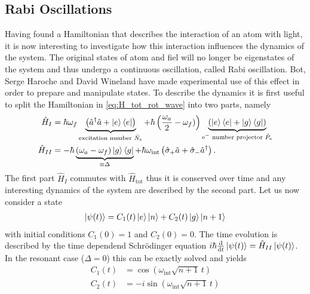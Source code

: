 \subsection{Rabi Oscillations}
Having found a Hamiltonian that describes the interaction of an atom with light,
it is now interesting to investigate how this interaction influences the
dynamics of the system. The original states of atom and fiel will no longer be
eigenstates of the system and thus undergo a continuous oscillation, called Rabi
oscillation. Bot, Serge Haroche and David Wineland have made experimental use of
this effect in order to prepare and manipulate states. To describe the dynamics
it is first useful to split the Hamiltonian in \eqref{eq:H_tot_rot_wave} into
two parts, namely
\begin{align}
  \label{eq:H_I_H_II}
  \hat{H}_I &= \hbar\omega_f\underbrace{\left( \hat{a}^\dagger\hat{a} +
  \ket{e}\bra{e}\right)}_{\text{excitation number }\hat{N}_e} + \hbar \left( \frac{\omega_a}{2} -
\omega_f)\right)\underbrace{\left(\ket{e}\bra{e} +
\ket{g}\bra{g}\right)}_{\text{e$^-$ number projector }\hat{P}_e} \\
\hat{H}_{II} &= -\hbar \underbrace{\left(\omega_a -
\omega_f\right)\ket{g}\bra{g}}_{\equiv\Delta} +
\hbar\omega_{\text{int}}\left( \hat{\sigma}_+\hat{a} +
  \hat{\sigma}_-\hat{a}^\dagger  \right).
\end{align}
The first part $\hat{H}_I$ commutes with $\hat{H}_{\text{tot}}$ thus it is
conserved over time and any interesting dynamics of the system are described by
the second part. Let us now consider a state
\begin{align}
  \label{eq:psi_t}
  \ket{\psi(t)} = C_1(t)\ket{e}\ket{n} + C_2(t)\ket{g}\ket{n+1} 
\end{align}
with initial conditions $C_1(0) = 1$ and $C_2(0)=0$. The time evolution is
described by the time dependend Schrödinger equation
$i\hbar\frac{\text{d}}{\text{d}t}\ket{\psi(t)}
= \hat{H}_{II}\ket{\psi(t)}$. In the resonant case ($\Delta=0$) this can be
exactly solved and yields
\begin{align}
  \label{eq:psi_t_solution}
  C_1(t) &= \cos\left(\omega_{\text{int}}\sqrt{n+1}\,t\right) \\
  C_2(t) &= -i\sin\left(\omega_\text{int} \sqrt{n+1} \,t\right)
\end{align}

